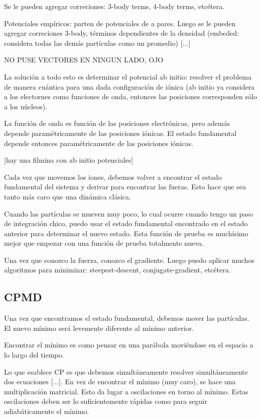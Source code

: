  Se le pueden agregar correciones: 3-body terms, 4-body terms, etcétera.

  Potenciales empíricos: parten de potenciales de a pares. Luego se le pueden agregar correciones 3-body, términos dependientes de la densidad (embeded: considera todas las demás partículas como un promedio)
  [...]

  NO PUSE VECTORES EN NINGUN LADO, OJO

  La solución a todo esto es determinar el potencial ab initio: resolver el problema de manera cuántica para una dada configuración de iónica (ab initio ya considera a los electornes como funciones de onda, entonces las posiciones corresponden sólo a los núcleos).

  La función de onda es función de las posiciones electrónicas, pero además depende paramétricamente de las posiciones iónicas. El estado fundamental depende entonces paramétricamente de las posiciones iónicas.

  [hay una filmina con ab initio potenciales]

  Cada vez que movemos los iones, debemos volver a encontrar el estado fundamental del sistema y derivar para encontrar las fueras. Esto hace que sea tanto más caro que una dinámica clásica.

  Cuando las partículas se mueven muy poco, lo cual ocurre cuando tengo un paso de integración chico, puedo usar el estado fundamental encontrado en el estado anterior para determinar el nuevo estado. Esta función de prueba es muchísimo mejor que empezar con una función de prueba totalmente nueva.

  Una vez que conozco la fuerza, conozco el gradiente. Luego puedo aplicar muchos algoritmos para minimizar: steepest-descent, conjugate-gradient, etcétera.

\subsection{CPMD}

  Una vez que encontramos el estado fundamental, debemos mover las partículas. El nuevo mínimo será levemente diferente al mínimo anterior.

  Encontrar el mínimo es como pensar en una parábola moviéndose en el espacio a lo largo del tiempo.

  Lo que esablece CP es que debemos simultáneamente resolver simultáneamente dos ecuaciones [...]. En vez de encontrar el mínimo (muy caro), se hace una multiplicación matricial. Esto da lugar a oscilaciones en torno al mínimo. Estas oscilaciones deben ser lo suficientemente rápidas como para seguir adiabáticamente el mínimo.

